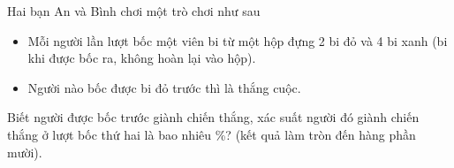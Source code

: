 \begin{ex}%
	Hai bạn An và Bình chơi một trò chơi như sau
	\begin{itemize}
		\item  Mỗi người lần lượt bốc một viên bi từ một hộp đựng 2 bi đỏ và 4 bi xanh (bi khi được bốc ra, không hoàn lại vào hộp).
		\item Người nào bốc được bi đỏ trước thì là thắng cuộc.
	\end{itemize}
	Biết người được bốc trước giành chiến thắng, xác suất người đó giành chiến thắng ở lượt bốc thứ hai là bao nhiêu \%? (kết quả làm tròn đến hàng phần mười). 
\end{ex}



